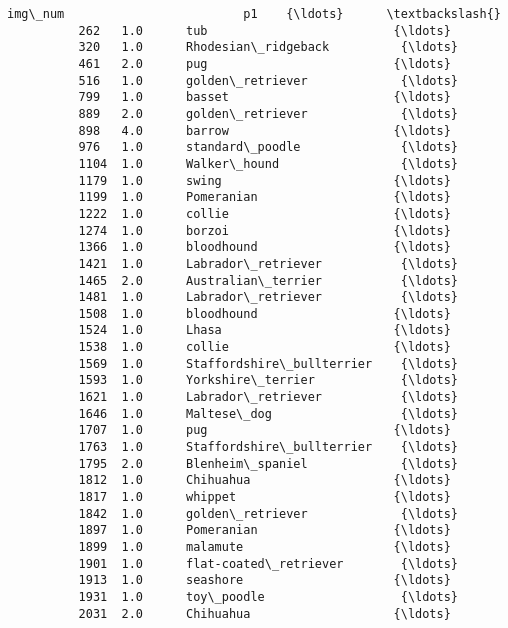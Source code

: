 \documentclass[11pt]{article}
\begin{document}
\begin{Verbatim}[commandchars=\\\{\}]
                img\_num                         p1    {\ldots}      \textbackslash{}
          262   1.0      tub                          {\ldots}       
          320   1.0      Rhodesian\_ridgeback          {\ldots}       
          461   2.0      pug                          {\ldots}       
          516   1.0      golden\_retriever             {\ldots}       
          799   1.0      basset                       {\ldots}       
          889   2.0      golden\_retriever             {\ldots}       
          898   4.0      barrow                       {\ldots}       
          976   1.0      standard\_poodle              {\ldots}       
          1104  1.0      Walker\_hound                 {\ldots}       
          1179  1.0      swing                        {\ldots}       
          1199  1.0      Pomeranian                   {\ldots}       
          1222  1.0      collie                       {\ldots}       
          1274  1.0      borzoi                       {\ldots}       
          1366  1.0      bloodhound                   {\ldots}       
          1421  1.0      Labrador\_retriever           {\ldots}       
          1465  2.0      Australian\_terrier           {\ldots}       
          1481  1.0      Labrador\_retriever           {\ldots}       
          1508  1.0      bloodhound                   {\ldots}       
          1524  1.0      Lhasa                        {\ldots}       
          1538  1.0      collie                       {\ldots}       
          1569  1.0      Staffordshire\_bullterrier    {\ldots}       
          1593  1.0      Yorkshire\_terrier            {\ldots}       
          1621  1.0      Labrador\_retriever           {\ldots}       
          1646  1.0      Maltese\_dog                  {\ldots}       
          1707  1.0      pug                          {\ldots}       
          1763  1.0      Staffordshire\_bullterrier    {\ldots}       
          1795  2.0      Blenheim\_spaniel             {\ldots}       
          1812  1.0      Chihuahua                    {\ldots}       
          1817  1.0      whippet                      {\ldots}       
          1842  1.0      golden\_retriever             {\ldots}       
          1897  1.0      Pomeranian                   {\ldots}       
          1899  1.0      malamute                     {\ldots}       
          1901  1.0      flat-coated\_retriever        {\ldots}       
          1913  1.0      seashore                     {\ldots}       
          1931  1.0      toy\_poodle                   {\ldots}       
          2031  2.0      Chihuahua                    {\ldots}       

\end{Verbatim}
\end{document}
